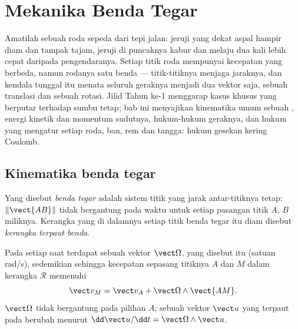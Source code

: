 \chapter{Mekanika Benda Tegar}\label{ch:b2:rigid-body-mechanics}

Amatilah sebuah roda sepeda dari tepi jalan: jeruji yang dekat aspal
hampir diam dan tampak tajam, jeruji di puncaknya kabur dan melaju dua
kali lebih cepat daripada pengendaranya. Setiap titik roda mempunyai
kecepatan yang berbeda, namun rodanya satu benda --- titik-titiknya
menjaga jaraknya, dan kendala tunggal itu menata seluruh geraknya
menjadi dua vektor saja, sebuah translasi dan sebuah rotasi. Jilid Tahun
ke-1 menggarap kasus khusus  yang berputar terhadap sumbu
tetap; bab ini menyajikan kinematika umum sebuah , energi
kinetik dan momentum sudutnya, hukum-hukum geraknya, dan hukum yang
mengatur setiap roda, ban, rem dan tangga: hukum gesekan kering Coulomb.

\section{Kinematika benda tegar}

\begin{definition}\label{def:b2:rigid-body-mechanics:solid}
Yang disebut \emph{benda tegar} adalah sistem titik yang jarak
antar-titiknya tetap: $\|\vect{AB}\|$ tidak bergantung pada waktu untuk
setiap pasangan titik $A$, $B$ miliknya. Kerangka yang di dalamnya setiap
titik benda tegar itu diam disebut \emph{kerangka terpaut benda}.
\end{definition}

\begin{theorem}\label{thm:b2:rigid-body-mechanics:field}
Pada setiap saat terdapat sebuah vektor $\vect\Omega$, yang disebut
\emph{}  itu (satuan \unit{rad/s}), sedemikian
sehingga kecepatan sepasang titiknya $A$ dan $M$ dalam kerangka $\mathcal R$ memenuhi
\[
\vect v_M = \vect v_A + \vect\Omega\wedge\vect{AM} .
\]
$\vect\Omega$ tidak bergantung pada pilihan $A$; sebuah vektor $\vect u$
yang terpaut pada  berubah menurut $\dd\vect u/\dd t = \vect\Omega\wedge\vect u$.
\end{theorem}

